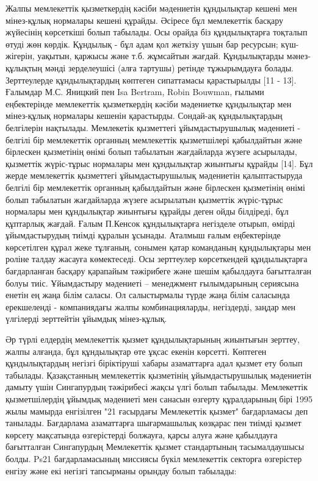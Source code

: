 Жалпы мемлекеттік қызметкердің кәсіби мәдениетін құндылықтар кешені мен
мінез-құлық нормалары кешені құрайды. Әсіресе бұл мемлекеттік басқару
жүйесінің көрсеткіші болып табылады. Осы орайда біз құндылықтарға
тоқталып өтуді жөн көрдік. Құндылық - бұл адам қол жеткізу үшын бар
ресурсын; күш-жігерін, уақытын, қаржысы және т.б. жұмсайтын жағдай.
Құндылықтарды мәнез-құлықтың мәнді зерделеушісі (алға тартушы) ретінде
тұжырымдауға болады. Зерттеулерде құндылықтардың көптеген сипаттамасы
қарастырылды {[}11 - 13{]}. Ғалымдар М.С. Яницкий пен Isa Bertram, Robin
Bouwman, ғылыми еңбектерінде мемлекеттік қызметкердің кәсіби мәдениетке
құндылықтар мен мінез-құлық нормалары кешенін қарастырды. Сондай-ақ
құндылықтардың белгілерін нақтылады. Мемлекетік қызметтегі
ұйымдастырушылық мәдениеті - белгілі бір мемлекеттік органның
мемлекеттік қызметшілері қабылдайтын және бірлескен қызметінің өнімі
болып табылатын жағдайларда жүзеге асырылады, қызметтік жүріс-тұрыс
нормалары мен құндылықтар жиынтығы құрайды {[}14{]}. Бұл жерде
мемлекеттік қызметтегі ұйымдастырушылық мәдениетін қалыптастыруда
белгілі бір мемлекеттік органның қабылдайтын және бірлескен қызметінің
өнімі болып табылатын жағдайларда жүзеге асырылатын қызметтік
жүріс-тұрыс нормалары мен құндылықтар жиынтығы құрайды деген ойды
білдіреді, бұл құптарлық жағдай. Ғалым П.Кенсок құндылықтарға негізделе
отырып, өмірді ұйымдастырудың тиімді құралын ұсынады. Аталмыш ғалым
еңбектерінде көрсетілген құрал жеке тұлғаның, сонымен қатар команданың
құндылықтары мен роліне талдау жасауға көмектеседі. Осы зерттеулер
көрсеткендей құндылықтарға бағдарланған басқару қарапайым тәжірибеге
және шешім қабылдауға бағытталған болуы тиіс. Ұйымдастыру мәдениеті --
менеджмент ғылымдарының сериясына енетін ең жаңа білім саласы. Ол
салыстырмалы түрде жаңа білім саласында ерекшеленді - компаниядағы жалпы
комбинацияларды, негіздерді, заңдар мен үлгілерді зерттейтін ұйымдық
мінез-құлық.

Әр түрлі елдердің мемлекеттік қызмет құндылықтарының жиынтығын зерттеу,
жалпы алғанда, бұл құндылықтар өте ұқсас екенін көрсетті. Көптеген
құндылықтардың негізгі біріктіруші хабары азаматтарға адал қызмет ету
болып табылады. Қазақстанның мемлекеттік қызметінің ұйымдастырушылық
мәдениетін дамыту үшін Сингапурдың тәжірибесі жақсы үлгі болып табылады.
Мемлекеттік қызметшілердің ұйымдық мәдениеті мен санасын өзгерту
құралдарының бірі 1995 жылы мамырда енгізілген "21 ғасырдағы Мемлекеттік
қызмет" бағдарламасы деп танылады. Бағдарлама азаматтарға шығармашылық
көзқарас пен тиімді қызмет көрсету мақсатында өзгерістерді болжауға,
қарсы алуға және қабылдауға бағытталған Сингапурдың Мемлекеттік қызмет
стандартының тасымалдаушысы болды. Ps21 бағдарламасының миссиясы бүкіл
мемлекеттік секторға өзгерістер енгізу және екі негізгі тапсырманы
орындау болып табылады:

